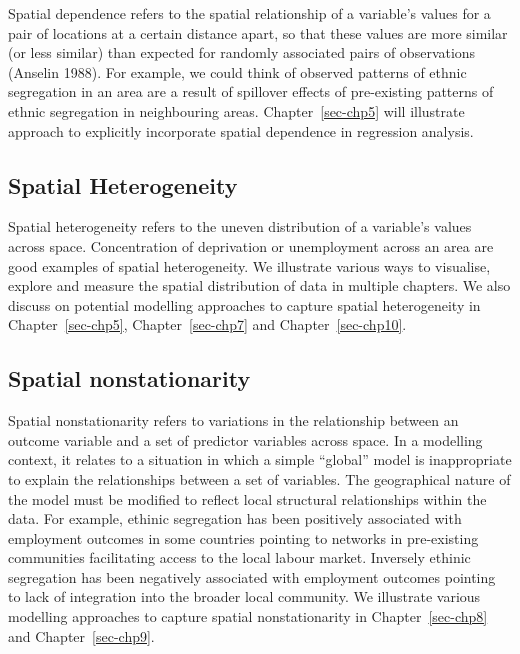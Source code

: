 \documentclass[
  letterpaper,
  DIV=11,
  numbers=noendperiod,
  oneside]{scrreprt}
\begin{document}
Spatial dependence refers to the spatial relationship of a variable's
values for a pair of locations at a certain distance apart, so that
these values are more similar (or less similar) than expected for
randomly associated pairs of observations (Anselin 1988). For example,
we could think of observed patterns of ethnic segregation in an area are
a result of spillover effects of pre-existing patterns of ethnic
segregation in neighbouring areas. Chapter~\ref{sec-chp5} will
illustrate approach to explicitly incorporate spatial dependence in
regression analysis.

\subsection{Spatial Heterogeneity}\label{spatial-heterogeneity}

Spatial heterogeneity refers to the uneven distribution of a variable's
values across space. Concentration of deprivation or unemployment across
an area are good examples of spatial heterogeneity. We illustrate
various ways to visualise, explore and measure the spatial distribution
of data in multiple chapters. We also discuss on potential modelling
approaches to capture spatial heterogeneity in Chapter~\ref{sec-chp5},
Chapter~\ref{sec-chp7} and Chapter~\ref{sec-chp10}.

\subsection{Spatial nonstationarity}\label{spatial-nonstationarity}

Spatial nonstationarity refers to variations in the relationship between
an outcome variable and a set of predictor variables across space. In a
modelling context, it relates to a situation in which a simple
``global'' model is inappropriate to explain the relationships between a
set of variables. The geographical nature of the model must be modified
to reflect local structural relationships within the data. For example,
ethinic segregation has been positively associated with employment
outcomes in some countries pointing to networks in pre-existing
communities facilitating access to the local labour market. Inversely
ethinic segregation has been negatively associated with employment
outcomes pointing to lack of integration into the broader local
community. We illustrate various modelling approaches to capture spatial
nonstationarity in Chapter~\ref{sec-chp8} and Chapter~\ref{sec-chp9}.

\end{document}

